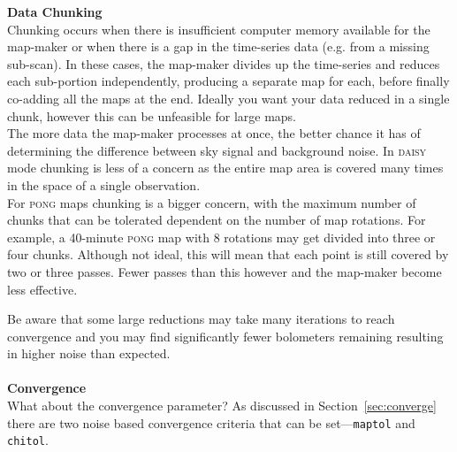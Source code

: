 \documentclass[twoside,11pt]{article}
\newcommand{\htmlref}[2]{#1}
\newenvironment{latexonly}{}{}
\newcommand{\latexhtml}[2]{#1}
\renewcommand{\_}{\texttt{\symbol{95}}}
\newenvironment{fmpage}[1]{\begin{lrbox}{\fmbox}\begin{minipage}{#1}}{\end{minipage}\end{lrbox}\fbox{\usebox{\fmbox}}}
\newcommand{\cref}[3]{\latexhtml{#1~\ref{#2}}{\htmlref{#3}{#2}}}
\begin{document}
\begin{latexonly}
\begin{center}
\begin{fmpage}{0.92\linewidth}
\label{page:text}
\begin{minipage}[t!]{0.025\linewidth}
\hspace{0.1cm}
\end{minipage}
\begin{minipage}[t!]{0.93\linewidth}
\vspace{0.2cm}
\textbf{Data Chunking}\\
Chunking occurs when there is insufficient computer memory available
for the map-maker or when there is a gap in the time-series data (e.g.
from a missing sub-scan). In these cases, the map-maker divides up the
time-series and reduces each sub-portion independently, producing a
separate map for each, before finally co-adding all the maps at the
end. Ideally you want your data reduced in a single chunk, however
this can be unfeasible for large maps.
\vspace{0.2cm}\\
The more data the map-maker processes at once, the better chance it
has of determining the difference between sky signal and background
noise. In \textsc{daisy} mode chunking is less of a concern as
the entire map area is covered many times in the space of a single
observation.
\vspace{0.2cm}\\
For \textsc{pong} maps chunking is a bigger concern, with the
maximum number of chunks that can be tolerated dependent on the number
of map rotations. For example, a 40-minute \textsc{pong} map with 8
rotations may get divided into three or four chunks. Although not
ideal, this will mean that each point is still covered by two or three
passes. Fewer passes than this however and the map-maker become less
effective.
\vspace{0.2cm}
\end{minipage}
\begin{minipage}[t!]{0.025\linewidth}
\hspace{0.1cm}
\end{minipage}
\end{fmpage}
\end{center}
\end{latexonly}

Be aware that some large reductions may take many iterations to reach
convergence and you may find significantly fewer bolometers remaining
resulting in higher noise than expected.
\\ \\
\textbf{Convergence}\\
What about the convergence parameter? As discussed in
\cref{Section}{sec:converge}{Convergence} there are two noise based
convergence criteria that can be set---\texttt{maptol} and \texttt{chitol}.
\end{document}
